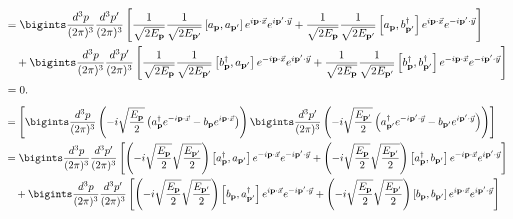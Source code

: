 {\begin{align*}
    &= \bigints\frac{d^3p}{(2\pi)^3} \frac{d^3p^\prime}{(2\pi)^3}\left[\frac{1}{\sqrt{2E_{\mathbf{p}}}} \frac{1}{\sqrt{2E_{\mathbf{p}^\prime}}} \left[a_{\mathbf{p}}, a_{\mathbf{p}^\prime} \right] e^{i \mathbf{p} \cdot \vec{x}} e^{i \mathbf{p}^\prime \cdot \vec{y}}+ \frac{1}{\sqrt{2E_{\mathbf{p}}}} \frac{1}{\sqrt{2E_{\mathbf{p}^\prime}}} \left[a_{\mathbf{p}}, b^\dagger_{\mathbf{p}^\prime} \right] e^{i \mathbf{p} \cdot \vec{x}} e^{-i \mathbf{p}^\prime \cdot \vec{y}}\right] \\
    & \quad + \bigints\frac{d^3p}{(2\pi)^3} \frac{d^3p^\prime}{(2\pi)^3}\left[\frac{1}{\sqrt{2E_{\mathbf{p}}}} \frac{1}{\sqrt{2E_{\mathbf{p}^\prime}}} \left[b^\dagger_{\mathbf{p}}, a_{\mathbf{p}^\prime} \right] e^{-i \mathbf{p} \cdot \vec{x}} e^{i \mathbf{p}^\prime \cdot \vec{y}} + \frac{1}{\sqrt{2E_{\mathbf{p}}}} \frac{1}{\sqrt{2E_{\mathbf{p}^\prime}}} \left[b^\dagger_{\mathbf{p}}, b^\dagger_{\mathbf{p}^\prime} \right] e^{-i \mathbf{p} \cdot \vec{x}} e^{-i \mathbf{p}^\prime \cdot \vec{y}} \right] \\
    &= 0.
\end{align*}
\begin{align*}
    [\pi(\vec{x}), \pi(\vec{y})] &= \left[ \bigints\frac{d^3p}{(2\pi)^3} \left(-i \sqrt{\frac{E_{\mathbf{p}}}{2}} \left(a^\dagger_{\mathbf{p}} e^{-i \mathbf{p} \cdot \vec{x}} - b_{\mathbf{p}} e^{i \mathbf{p} \cdot \vec{x}}\right)\right)\bigints\frac{d^3p^\prime}{(2\pi)^3} \left(-i \sqrt{\frac{E_{\mathbf{p}^\prime}}{2}} \left(a^\dagger_{\mathbf{p}^\prime} e^{-i \mathbf{p}^\prime \cdot \vec{y}} - b_{\mathbf{p}^\prime} e^{i \mathbf{p}^\prime \cdot \vec{y}}\right)\right) \right] \\
    &= \bigints\frac{d^3p}{(2\pi)^3} \frac{d^3p^\prime}{(2\pi)^3} \left[\left(-i \sqrt{\frac{E_{\mathbf{p}}}{2}} \sqrt{\frac{E_{\mathbf{p}^\prime}}{2}}\right) \left[a^\dagger_{\mathbf{p}}, a_{\mathbf{p}^\prime}\right] e^{-i \mathbf{p} \cdot \vec{x}} e^{-i \mathbf{p}^\prime \cdot \vec{y}} + \left(-i \sqrt{\frac{E_{\mathbf{p}}}{2}} \sqrt{\frac{E_{\mathbf{p}^\prime}}{2}}\right) \left[a^\dagger_{\mathbf{p}}, b_{\mathbf{p}^\prime}\right] e^{-i \mathbf{p} \cdot \vec{x}} e^{i \mathbf{p}^\prime \cdot \vec{y}}\right] \\
    & \quad + \bigints\frac{d^3p}{(2\pi)^3} \frac{d^3p^\prime}{(2\pi)^3} \left[\left(-i \sqrt{\frac{E_{\mathbf{p}}}{2}} \sqrt{\frac{E_{\mathbf{p}^\prime}}{2}}\right) \left[b_{\mathbf{p}}, a^\dagger_{\mathbf{p}^\prime}\right] e^{i \mathbf{p} \cdot \vec{x}} e^{-i \mathbf{p}^\prime \cdot \vec{y}} + \left(-i \sqrt{\frac{E_{\mathbf{p}}}{2}} \sqrt{\frac{E_{\mathbf{p}^\prime}}{2}}\right) \left[b_{\mathbf{p}}, b_{\mathbf{p}^\prime}\right] e^{i \mathbf{p} \cdot \vec{x}} e^{i \mathbf{p}^\prime \cdot \vec{y}}\right] \\

\end{align*}}
